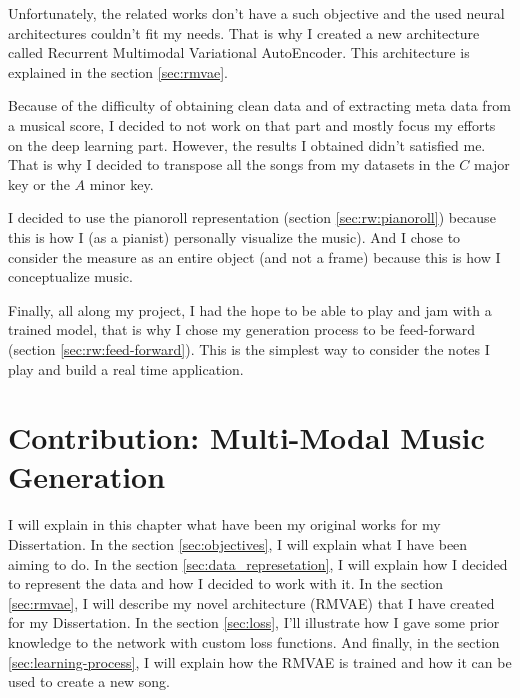 \documentclass[12pt]{report}
\begin{document}
Unfortunately, the related works don't have a such objective and the used neural architectures couldn't fit my needs.
That is why I created a new architecture called Recurrent Multimodal Variational AutoEncoder.
This architecture is explained in the section \ref{sec:rmvae}.

Because of the difficulty of obtaining clean data and of extracting meta data from a musical score, I decided to not work on that part and mostly focus my efforts on the deep learning part.
However, the results I obtained didn't satisfied me.
That is why I decided to transpose all the songs from my datasets in the $C$ major key or the $A$ minor key.

I decided to use the pianoroll representation (section \ref{sec:rw:pianoroll}) because this is how I (as a pianist) personally visualize the music).
And I chose to consider the measure as an entire object (and not a frame) because this is how I conceptualize music.

Finally, all along my project, I had the hope to be able to play and jam with a trained model, that is why I chose my generation process to be feed-forward (section \ref{sec:rw:feed-forward}).
This is the simplest way to consider the notes I play and build a real time application.

\newpage
\chapter{Contribution: Multi-Modal Music Generation}
\label{chap:contribution}

I will explain in this chapter what have been my original works for my Dissertation.
In the section \ref{sec:objectives}, I will explain what I have been aiming to do.
In the section \ref{sec:data_represetation}, I will explain how I decided to represent the data and how I decided to work with it.
In the section \ref{sec:rmvae}, I will describe my novel architecture (RMVAE) that I have created for my Dissertation.
In the section \ref{sec:loss}, I'll illustrate how I gave some prior knowledge to the network with custom loss functions.
And finally, in the section \ref{sec:learning-process}, I will explain how the RMVAE is trained and how it can be used to create a new song.

\end{document}
